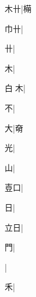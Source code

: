 \begin{multicols}{2}
{{\cjk{}{\cnsym{}　}木卄}|{\cjk{}橗}\par
{\cjk{}{\cnsym{}　}巾卄}|{}\par
{卄}|{}\par
{\cjk{}{\cnsym{}　}{\cnsym{}　}木}|{}\par
{\cjk{}白{\cnjzr{}}木}|{}\par
{\cjk{}{\cnsym{}　}{\cnsym{}　}不}|{}\par
{\cjk{}{\cnsym{}　}{\cnsym{}　}大}|{\cjk{}奛}\par
{\cjk{}{\cnsym{}　}{\cnsym{}　}光}|{}\par
{\cjk{}{\cnsym{}　}{\cnsym{}　}山}|{}\par
{\cjk{}{\cnsym{}　}壴口}|{}\par
{\cjk{}{\cnsym{}　}{\cnsym{}　}日}|{}\par
{\cjk{}{\cnsym{}　}立日}|{}\par
{\cjk{}{\cnsym{}　}{\cnsym{}　}門}|{}\par
{}|{}\par
{\cjk{}{\cnsym{}　}{\cnsym{}　}禾}|{}\par
}
\end{multicols}
